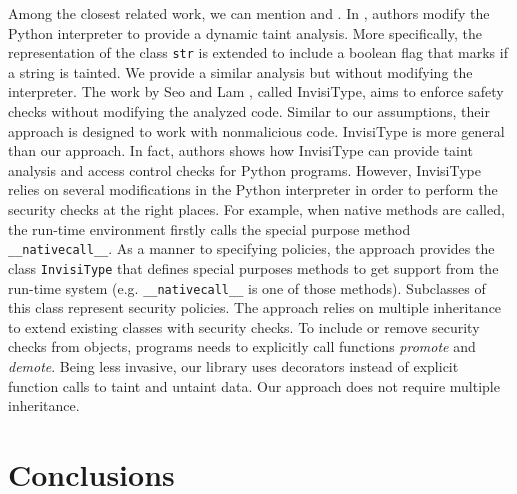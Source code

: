 \documentclass[oribibl]{llncs}
\begin{document}
Among the closest related work, we can mention 
\cite{KozlovPetukhov07} and \cite{SeoLam2010}.
In  \cite{KozlovPetukhov07}, authors modify the Python interpreter 
to provide a dynamic taint analysis. More specifically, %
the representation of the class \texttt{str} is extended to include a boolean 
flag that marks if a string is tainted. We provide a similar analysis 
but without modifying the interpreter.
The work by Seo and Lam \cite{SeoLam2010}, called InvisiType, 
aims to enforce safety checks without 
modifying the analyzed code. Similar to our assumptions, their approach 
is designed to work with nonmalicious code. InvisiType is more general 
than our approach. In fact, authors shows how InvisiType can provide taint
analysis and access control checks for Python programs. However, 
InvisiType relies on several modifications in the Python interpreter 
in order to perform the security checks at the right places. 
For example, when native methods are called, 
the run-time environment firstly calls the special purpose 
method \texttt{\_\_nativecall\_\_}.  
As a manner to specifying policies, 
the approach provides the class \texttt{InvisiType} that defines special 
purposes methods to get support from the run-time system (e.g.
\texttt{\_\_nativecall\_\_} is one of those methods). 
Subclasses of this class represent security policies. 
The approach relies on multiple inheritance to 
extend existing classes with security checks. 
To include or remove security checks from objects, 
programs needs to explicitly call functions \emph{promote} and 
\emph{demote}. Being less invasive, our library uses 
decorators instead of explicit function calls to taint and
untaint data. 
Our approach does not require 
multiple inheritance. 

\section{Conclusions}
\label{sec:conclusions}
\end{document}
